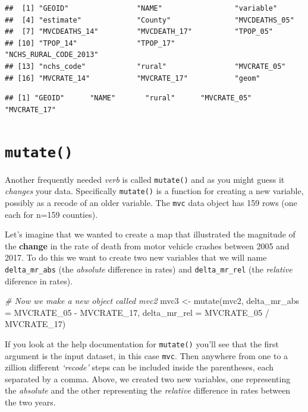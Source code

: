 \documentclass[
]{book}
\newenvironment{Shaded}{\begin{snugshade}}{\end{snugshade}}
\newcommand{\AttributeTok}[1]{\textcolor[rgb]{0.77,0.63,0.00}{#1}}
\newcommand{\CommentTok}[1]{\textcolor[rgb]{0.56,0.35,0.01}{\textit{#1}}}
\newcommand{\FunctionTok}[1]{\textcolor[rgb]{0.00,0.00,0.00}{#1}}
\newcommand{\NormalTok}[1]{#1}
\newcommand{\OtherTok}[1]{\textcolor[rgb]{0.56,0.35,0.01}{#1}}
\newcommand{\SpecialCharTok}[1]{\textcolor[rgb]{0.00,0.00,0.00}{#1}}
\begin{document}
\begin{verbatim}
##  [1] "GEOID"                "NAME"                 "variable"            
##  [4] "estimate"             "County"               "MVCDEATHS_05"        
##  [7] "MVCDEATHS_14"         "MVCDEATH_17"          "TPOP_05"             
## [10] "TPOP_14"              "TPOP_17"              "NCHS_RURAL_CODE_2013"
## [13] "nchs_code"            "rural"                "MVCRATE_05"          
## [16] "MVCRATE_14"           "MVCRATE_17"           "geom"
\end{verbatim}

\begin{verbatim}
## [1] "GEOID"      "NAME"       "rural"      "MVCRATE_05" "MVCRATE_17"
\end{verbatim}

\hypertarget{mutate}{%
\section{\texorpdfstring{\texttt{mutate()}}{mutate()}}\label{mutate}}

Another frequently needed \emph{verb} is called \texttt{mutate()} and as you might guess it \emph{changes} your data. Specifically \texttt{mutate()} is a function for creating a new variable, possibly as a recode of an older variable. The \texttt{mvc} data object has 159 rows (one each for n=159 counties).

Let's imagine that we wanted to create a map that illustrated the magnitude of the \textbf{change} in the rate of death from motor vehicle crashes between 2005 and 2017. To do this we want to create two new variables that we will name \texttt{delta\_mr\_abs} (the \emph{absolute} difference in rates) and \texttt{delta\_mr\_rel} (the \emph{relative} diference in rates).

\begin{Shaded}
\begin{Highlighting}[]
\CommentTok{\# Now we make a new object called mvc2}
\NormalTok{mvc3 }\OtherTok{\textless{}{-}} \FunctionTok{mutate}\NormalTok{(mvc2, }
               \AttributeTok{delta\_mr\_abs =}\NormalTok{ MVCRATE\_05 }\SpecialCharTok{{-}}\NormalTok{ MVCRATE\_17,}
               \AttributeTok{delta\_mr\_rel =}\NormalTok{ MVCRATE\_05 }\SpecialCharTok{/}\NormalTok{ MVCRATE\_17)}
\end{Highlighting}
\end{Shaded}

If you look at the help documentation for \texttt{mutate()} you'll see that the first argument is the input dataset, in this case \texttt{mvc}. Then anywhere from one to a zillion different \emph{`recode'} steps can be included inside the parentheses, each separated by a comma. Above, we created two new variables, one representing the \emph{absolute} and the other representing the \emph{relative} difference in rates between the two years.
\end{document}
